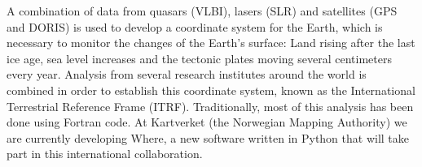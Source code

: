 A combination of data from quasars (VLBI), lasers (SLR) and satellites (GPS and
DORIS) is used to develop a coordinate system for the Earth, which is necessary
to monitor the changes of the Earth's surface: Land rising after the last ice
age, sea level increases and the tectonic plates moving several centimeters
every year. Analysis from several research institutes around the world is
combined in order to establish this coordinate system, known as the
International Terrestrial Reference Frame (ITRF). Traditionally, most of this
analysis has been done using Fortran code. At Kartverket (the Norwegian Mapping
Authority) we are currently developing Where, a new software written in Python
that will take part in this international collaboration.

\endinput

